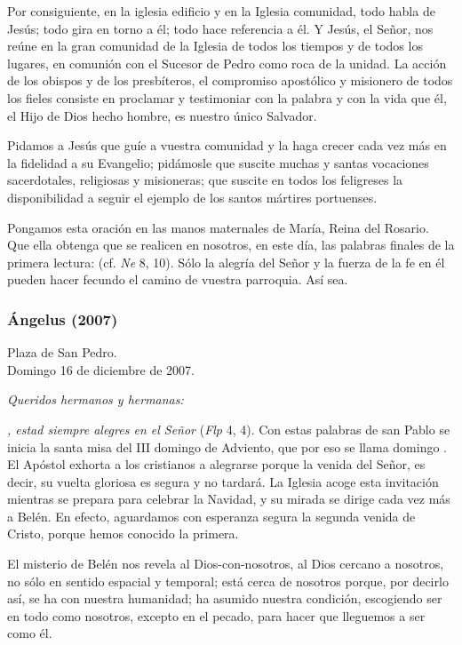 \begin{body}
\begin{body}
Por consiguiente, en la iglesia edificio y en la Iglesia comunidad, todo habla de Jesús; todo gira en torno a él; todo hace referencia a él. Y Jesús, el Señor, nos reúne en la gran comunidad de la Iglesia de todos los tiempos y de todos los lugares, en comunión con el Sucesor de Pedro como roca de la unidad. La acción de los obispos y de los presbíteros, el compromiso apostólico y misionero de todos los fieles consiste en proclamar y testimoniar con la palabra y con la vida que él, el Hijo de Dios hecho hombre, es nuestro único Salvador.

Pidamos a Jesús que guíe a vuestra comunidad y la haga crecer cada vez más en la fidelidad a su Evangelio; pidámosle que suscite muchas y santas vocaciones sacerdotales, religiosas y misioneras; que suscite en todos los feligreses la disponibilidad a seguir el ejemplo de los santos mártires portuenses.

Pongamos esta oración en las manos maternales de María, Reina del Rosario. Que ella obtenga que se realicen en nosotros, en este día, las palabras finales de la primera lectura:  (cf. \emph{Ne} 8, 10). Sólo la alegría del Señor y la fuerza de la fe en él pueden hacer fecundo el camino de vuestra parroquia. Así sea.

\subsubsection{Ángelus (2007)}  
	
Plaza de San Pedro.\\ Domingo 16 de diciembre de 2007.


\emph{Queridos hermanos y hermanas:} 

\emph{, estad siempre alegres en el Señor} (\emph{Flp} 4, 4). Con estas palabras de san Pablo se inicia la santa misa del III domingo de Adviento, que por eso se llama domingo \emph{}. El Apóstol exhorta a los cristianos a alegrarse porque la venida del Señor, es decir, su vuelta gloriosa es segura y no tardará. La Iglesia acoge esta invitación mientras se prepara para celebrar la Navidad, y su mirada se dirige cada vez más a Belén. En efecto, aguardamos con esperanza segura la segunda venida de Cristo, porque hemos conocido la primera.

El misterio de Belén nos revela al Dios-con-nosotros, al Dios cercano a nosotros, no sólo en sentido espacial y temporal; está cerca de nosotros porque, por decirlo así, se ha  con nuestra humanidad; ha asumido nuestra condición, escogiendo ser en todo como nosotros, excepto en el pecado, para hacer que lleguemos a ser como él.


\end{body}
\end{body}
